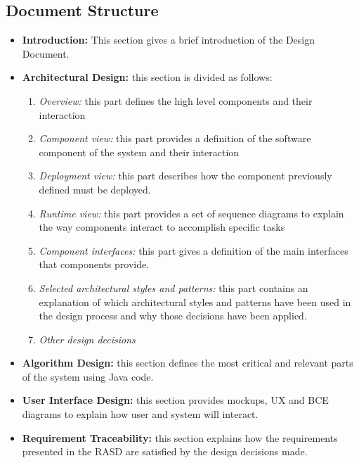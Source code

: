 \subsection{Document Structure}
\begin{itemize}
\item \textbf{Introduction:} This section gives a brief introduction of the Design Document.

\item \textbf{Architectural Design:} this section is divided as follows:
\begin{enumerate}
\item \textit{Overview:} this part defines the high level components and their interaction
\item \textit{Component view:} this part provides a definition of the software component of the system and their interaction
\item \textit{Deployment view:} this part describes how the component previously defined must be deployed.
\item \textit{Runtime view:} this part provides a set of sequence diagrams to explain the way components interact to accomplish specific tasks
\item \textit{Component interfaces:} this part gives a definition of the main interfaces that components provide.
\item \textit{Selected architectural styles	and patterns:} this part contains an explanation of which architectural styles and patterns have been used in the design process and why those decisions have been applied.
\item \textit{Other design decisions}
\end{enumerate}
\item \textbf{Algorithm Design:} this section defines the most critical and relevant parts of the system  using Java code.
\item \textbf{User Interface Design:} this section provides mockups, UX and BCE diagrams to explain how user and system will interact.
\item \textbf{Requirement Traceability:} this section  explains how the requirements presented in the RASD are satisfied by the design decisions made.
\end{itemize}
